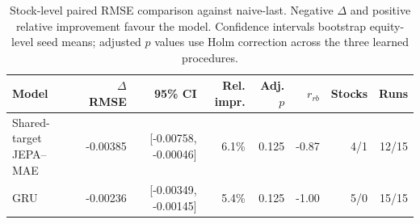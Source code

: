 \begin{table}[t]
\centering
\small
\caption{Stock-level paired RMSE comparison against naive-last. Negative $\Delta$ and positive relative improvement favour the model. Confidence intervals bootstrap equity-level seed means; adjusted $p$ values use Holm correction across the three learned procedures.}
\label{tab:paired_rmse_naive}
\begin{tabular}{lrrrrrrr}
\toprule
Model & $\Delta$RMSE & 95\% CI & Rel. impr. & Adj. $p$ & $r_{rb}$ & Stocks & Runs \\
\midrule
Shared-target JEPA--MAE & -0.00385 & [-0.00758, -0.00046] & 6.1\% & 0.125 & -0.87 & 4/1 & 12/15 \\
GRU & -0.00236 & [-0.00349, -0.00145] & 5.4\% & 0.125 & -1.00 & 5/0 & 15/15 \\
\bottomrule
\end{tabular}
\end{table}
